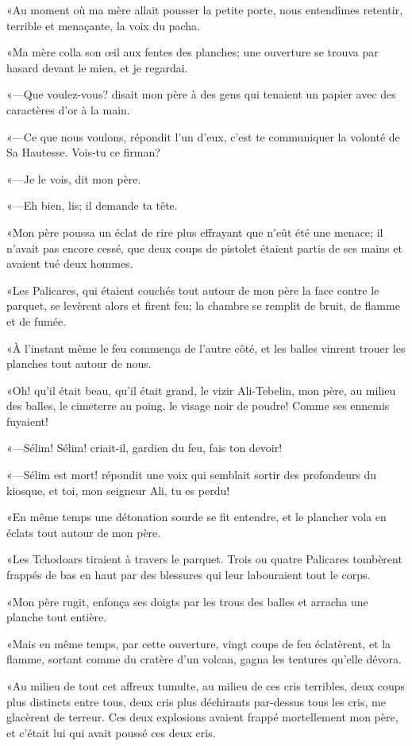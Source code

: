 «Au moment où ma mère allait pousser la petite porte, nous entendîmes retentir, terrible et menaçante, la voix du pacha. 

«Ma mère colla son œil aux fentes des planches; une ouverture se trouva par hasard devant le mien, et je regardai. 

«—Que voulez-vous? disait mon père à des gens qui tenaient un papier avec des caractères d'or à la main. 

«—Ce que nous voulons, répondit l'un d'eux, c'est te communiquer la volonté de Sa Hautesse. Vois-tu ce firman?  

«—Je le vois, dit mon père. 

«—Eh bien, lis; il demande ta tête. 

«Mon père poussa un éclat de rire plus effrayant que n'eût été une menace; il n'avait pas encore cessé, que deux coups de pistolet étaient partis de ses mains et avaient tué deux hommes. 

«Les Palicares, qui étaient couchés tout autour de mon père la face contre le parquet, se levèrent alors et firent feu; la chambre se remplit de bruit, de flamme et de fumée. 

«À l'instant même le feu commença de l'autre côté, et les balles vinrent trouer les planches tout autour de nous. 

«Oh! qu'il était beau, qu'il était grand, le vizir Ali-Tebelin, mon père, au milieu des balles, le cimeterre au poing, le visage noir de poudre! Comme ses ennemis fuyaient! 

«—Sélim! Sélim! criait-il, gardien du feu, fais ton devoir! 

«—Sélim est mort! répondit une voix qui semblait sortir des profondeurs du kiosque, et toi, mon seigneur Ali, tu es perdu! 

«En même temps une détonation sourde se fit entendre, et le plancher vola en éclats tout autour de mon père. 

«Les Tchodoars tiraient à travers le parquet. Trois ou quatre Palicares tombèrent frappés de bas en haut par des blessures qui leur labouraient tout le corps. 

«Mon père rugit, enfonça ses doigts par les trous des balles et arracha une planche tout entière. 

«Mais en même temps, par cette ouverture, vingt coups de feu éclatèrent, et la flamme, sortant comme du cratère d'un volcan, gagna les tentures qu'elle dévora. 

«Au milieu de tout cet affreux tumulte, au milieu de ces cris terribles, deux coups plus distincts entre tous, deux cris plus déchirants par-dessus tous les cris, me glacèrent de terreur. Ces deux explosions avaient frappé mortellement mon père, et c'était lui qui avait poussé ces deux cris. 

